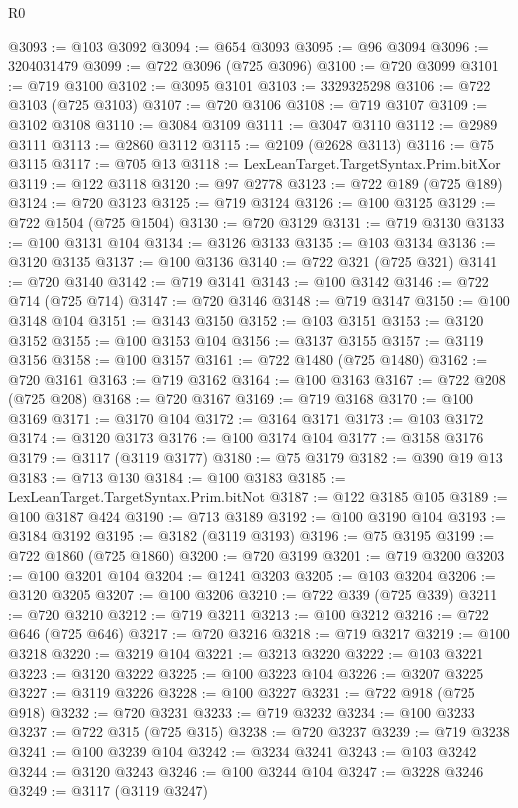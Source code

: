 \begin{lexlean}{R0}
\begin{coremodule}
@3093 := @103 @3092
@3094 := @654 @3093
@3095 := @96 @3094
@3096 := 3204031479
@3099 := @722 @3096 (@725 @3096)
@3100 := @720 @3099
@3101 := @719 @3100
@3102 := @3095 @3101
@3103 := 3329325298
@3106 := @722 @3103 (@725 @3103)
@3107 := @720 @3106
@3108 := @719 @3107
@3109 := @3102 @3108
@3110 := @3084 @3109
@3111 := @3047 @3110
@3112 := @2989 @3111
@3113 := @2860 @3112
@3115 := @2109 (@2628 @3113)
@3116 := @75 @3115
@3117 := @705 @13
@3118 := LexLeanTarget.TargetSyntax.Prim.bitXor
@3119 := @122 @3118
@3120 := @97 @2778
@3123 := @722 @189 (@725 @189)
@3124 := @720 @3123
@3125 := @719 @3124
@3126 := @100 @3125
@3129 := @722 @1504 (@725 @1504)
@3130 := @720 @3129
@3131 := @719 @3130
@3133 := @100 @3131 @104
@3134 := @3126 @3133
@3135 := @103 @3134
@3136 := @3120 @3135
@3137 := @100 @3136
@3140 := @722 @321 (@725 @321)
@3141 := @720 @3140
@3142 := @719 @3141
@3143 := @100 @3142
@3146 := @722 @714 (@725 @714)
@3147 := @720 @3146
@3148 := @719 @3147
@3150 := @100 @3148 @104
@3151 := @3143 @3150
@3152 := @103 @3151
@3153 := @3120 @3152
@3155 := @100 @3153 @104
@3156 := @3137 @3155
@3157 := @3119 @3156
@3158 := @100 @3157
@3161 := @722 @1480 (@725 @1480)
@3162 := @720 @3161
@3163 := @719 @3162
@3164 := @100 @3163
@3167 := @722 @208 (@725 @208)
@3168 := @720 @3167
@3169 := @719 @3168
@3170 := @100 @3169
@3171 := @3170 @104
@3172 := @3164 @3171
@3173 := @103 @3172
@3174 := @3120 @3173
@3176 := @100 @3174 @104
@3177 := @3158 @3176
@3179 := @3117 (@3119 @3177)
@3180 := @75 @3179
@3182 := @390 @19 @13
@3183 := @713 @130
@3184 := @100 @3183
@3185 := LexLeanTarget.TargetSyntax.Prim.bitNot
@3187 := @122 @3185 @105
@3189 := @100 @3187 @424
@3190 := @713 @3189
@3192 := @100 @3190 @104
@3193 := @3184 @3192
@3195 := @3182 (@3119 @3193)
@3196 := @75 @3195
@3199 := @722 @1860 (@725 @1860)
@3200 := @720 @3199
@3201 := @719 @3200
@3203 := @100 @3201 @104
@3204 := @1241 @3203
@3205 := @103 @3204
@3206 := @3120 @3205
@3207 := @100 @3206
@3210 := @722 @339 (@725 @339)
@3211 := @720 @3210
@3212 := @719 @3211
@3213 := @100 @3212
@3216 := @722 @646 (@725 @646)
@3217 := @720 @3216
@3218 := @719 @3217
@3219 := @100 @3218
@3220 := @3219 @104
@3221 := @3213 @3220
@3222 := @103 @3221
@3223 := @3120 @3222
@3225 := @100 @3223 @104
@3226 := @3207 @3225
@3227 := @3119 @3226
@3228 := @100 @3227
@3231 := @722 @918 (@725 @918)
@3232 := @720 @3231
@3233 := @719 @3232
@3234 := @100 @3233
@3237 := @722 @315 (@725 @315)
@3238 := @720 @3237
@3239 := @719 @3238
@3241 := @100 @3239 @104
@3242 := @3234 @3241
@3243 := @103 @3242
@3244 := @3120 @3243
@3246 := @100 @3244 @104
@3247 := @3228 @3246
@3249 := @3117 (@3119 @3247)

\end{coremodule}
\end{lexlean}
